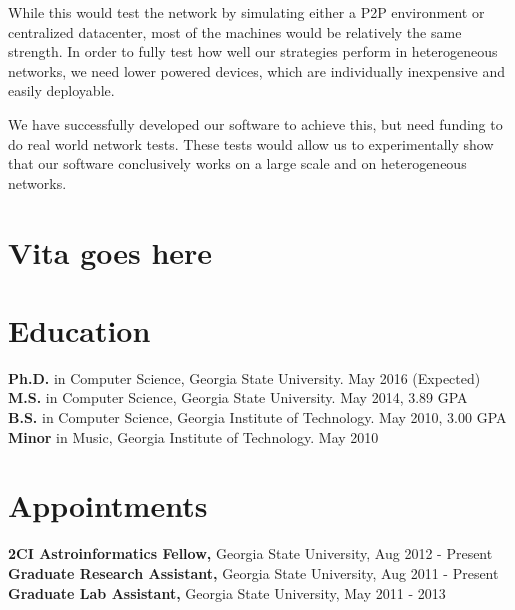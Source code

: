 \documentclass[12pt,a4paper]{article}
\begin{document}

While this would test the network by simulating either a P2P environment or centralized datacenter, most of the machines would be relatively the same strength.
In order to fully test how well our strategies perform in heterogeneous networks, we need lower powered devices, which are individually inexpensive and easily deployable.

We have successfully developed our software to achieve this, but need funding to do real world network tests. 
These tests would allow us to experimentally show that our software conclusively works on a large scale and on heterogeneous networks.





\newpage



\section{Vita goes here}

\section*{Education}          
    
{\bf Ph.D.} in Computer Science, Georgia State University. May 2016 (Expected)\\
{\bf M.S.} in Computer Science, Georgia State University. May 2014, 3.89 GPA \\
{\bf B.S.} in Computer Science, Georgia Institute of Technology. May 2010, 3.00 GPA\\
{\bf Minor} in Music, Georgia Institute of Technology. May 2010\\
	
\section*{Appointments}
{\bf 2CI Astroinformatics Fellow,} Georgia State University, Aug 2012 - Present\\
{\bf Graduate Research Assistant,} Georgia State University, Aug 2011 - Present\\
{\bf Graduate Lab Assistant,} Georgia State University, May 2011 - 2013
\end{document}
